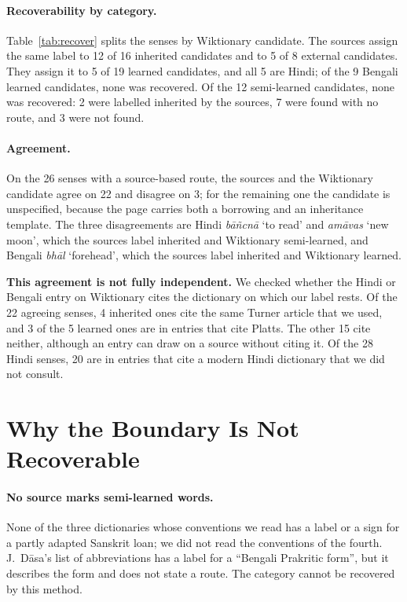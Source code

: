 \documentclass[11pt]{article}
\newcommand{\gl}[1]{`#1'}
\begin{document}
\paragraph{Recoverability by category.} Table~\ref{tab:recover} splits the senses by Wiktionary candidate. The sources assign the same label to 12 of 16 inherited candidates and to 5 of 8 external candidates. They assign it to 5 of 19 learned candidates, and all 5 are Hindi; of the 9 Bengali learned candidates, none was recovered. Of the 12 semi-learned candidates, none was recovered: 2 were labelled inherited by the sources, 7 were found with no route, and 3 were not found.

\paragraph{Agreement.} On the 26 senses with a source-based route, the sources and the Wiktionary candidate agree on 22 and disagree on 3; for the remaining one the candidate is unspecified, because the page carries both a borrowing and an inheritance template. The three disagreements are Hindi \textit{b\=a\~ncn\=a} \gl{to read} and \textit{am\=avas} \gl{new moon}, which the sources label inherited and Wiktionary semi-learned, and Bengali \textit{bh\=al} \gl{forehead}, which the sources label inherited and Wiktionary learned.

\textbf{This agreement is not fully independent.} We checked whether the Hindi or Bengali entry on Wiktionary cites the dictionary on which our label rests. Of the 22 agreeing senses, 4 inherited ones cite the same Turner article that we used, and 3 of the 5 learned ones are in entries that cite Platts. The other 15 cite neither, although an entry can draw on a source without citing it. Of the 28 Hindi senses, 20 are in entries that cite a modern Hindi dictionary that we did not consult.

\section{Why the Boundary Is Not Recoverable}
\label{sec:why}

\paragraph{No source marks semi-learned words.} None of the three dictionaries whose conventions we read has a label or a sign for a partly adapted Sanskrit loan; we did not read the conventions of the fourth. J.~D\=asa's list of abbreviations has a label for a ``Bengali Prakritic form'', but it describes the form and does not state a route. The category cannot be recovered by this method.
\end{document}
